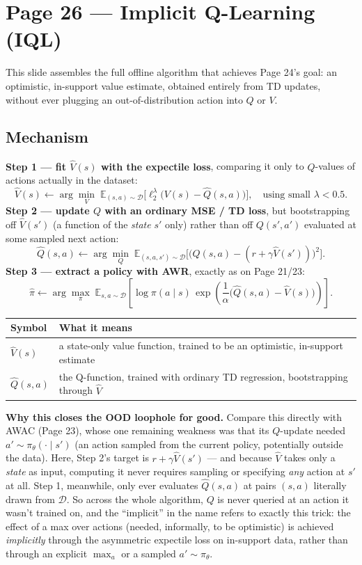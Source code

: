 \documentclass[11pt]{article}
\begin{document}
\section*{Page 26 --- Implicit Q-Learning (IQL)}

This slide assembles the full offline algorithm that achieves Page 24's goal: an optimistic, in-support value estimate, obtained entirely from TD updates, without ever plugging an out-of-distribution action into $Q$ or $V$.

\subsection*{Mechanism}

\textbf{Step 1 --- fit $\hat V(s)$ with the expectile loss}, comparing it only to $Q$-values of actions actually in the dataset:
\[
\hat V(s) \leftarrow \arg\min_V\; \mathbb{E}_{(s,a)\sim\mathcal{D}}\Big[\ell_2^\lambda\big(V(s) - \hat Q(s,a)\big)\Big], \quad \text{using small } \lambda < 0.5.
\]
\textbf{Step 2 --- update $Q$ with an ordinary MSE / TD loss}, but bootstrapping off $\hat V(s')$ (a function of the \emph{state} $s'$ only) rather than off $Q(s',a')$ evaluated at some sampled next action:
\[
\hat Q(s,a) \leftarrow \arg\min_Q\; \mathbb{E}_{(s,a,s')\sim\mathcal{D}}\Big[\big(Q(s,a) - (r + \gamma\hat V(s'))\big)^2\Big].
\]
\textbf{Step 3 --- extract a policy with AWR}, exactly as on Page 21/23:
\[
\hat\pi \leftarrow \arg\max_\pi\; \mathbb{E}_{s,a\sim\mathcal{D}}\left[\log\pi(a\mid s)\, \exp\!\left(\frac{1}{\alpha}\big(\hat Q(s,a) - \hat V(s)\big)\right)\right].
\]

\begin{center}
\begin{tabular}{@{}ll@{}}
\toprule
Symbol & What it means \\
\midrule
$\hat V(s)$ & a state-only value function, trained to be an optimistic, in-support estimate \\
$\hat Q(s,a)$ & the Q-function, trained with ordinary TD regression, bootstrapping through $\hat V$ \\
\bottomrule
\end{tabular}
\end{center}

\textbf{Why this closes the OOD loophole for good.} Compare this directly with AWAC (Page 23), whose one remaining weakness was that its $Q$-update needed $a'\sim\pi_\theta(\cdot\mid s')$ (an action sampled from the current policy, potentially outside the data). Here, Step 2's target is $r+\gamma\hat V(s')$ --- and because $\hat V$ takes only a \emph{state} as input, computing it never requires sampling or specifying \emph{any} action at $s'$ at all. Step 1, meanwhile, only ever evaluates $\hat Q(s,a)$ at pairs $(s,a)$ literally drawn from $\mathcal{D}$. So across the whole algorithm, $Q$ is never queried at an action it wasn't trained on, and the ``implicit'' in the name refers to exactly this trick: the effect of a max over actions (needed, informally, to be optimistic) is achieved \emph{implicitly} through the asymmetric expectile loss on in-support data, rather than through an explicit $\max_a$ or a sampled $a'\sim\pi_\theta$.
\end{document}
